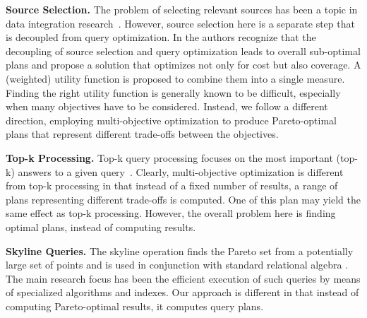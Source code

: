 \textbf{Source Selection.} The problem of selecting relevant sources
has been a topic in data integration research~\cite{levy_querying_1996}. 
However, 
source selection here is a separate step that is decoupled from query
optimization. In \cite{nie_joint_2001} the authors recognize that the decoupling of
source selection and query optimization leads to overall sub-optimal
plans and propose a solution that optimizes not only for cost but
also coverage. A (weighted) utility function is proposed to combine them 
into a single measure. 
Finding the right utility function is generally known to be difficult, especially when many objectives have to be considered. Instead, we follow a different direction, employing multi-objective optimization to produce Pareto-optimal plans that represent different trade-offs between the objectives.

\textbf{Top-k Processing.} Top-k query processing focuses on the most important (top-k) answers to a
given query~\cite{ilyas_survey_2008}. 
Clearly, multi-objective optimization is different from top-k
processing in that instead of a fixed number of results, a range of plans representing different trade-offs is computed. One of this plan may yield the same effect as top-k processing. However, the overall problem here is finding optimal plans, instead of computing results.

\textbf{Skyline Queries.} The skyline operation finds the Pareto
set from a potentially large set of points and is used in conjunction
with standard relational algebra \cite{boerzsoenyi_skyline_2001}. The
main research focus has been the efficient execution of such queries
by means of specialized algorithms and indexes. Our approach is
different in that instead of computing Pareto-optimal results, it computes query plans.

